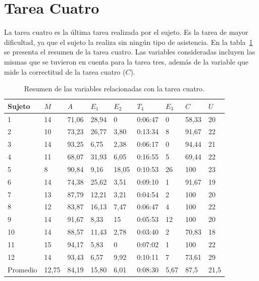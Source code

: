 \section{Tarea Cuatro}

La tarea cuatro es la \'ultima tarea realizada por el sujeto. Es la tarea
de mayor dificultad, ya que el sujeto la realiza sin ning\'un tipo de asistencia. 
En la tabla~\ref{sec:tabla-tarea4} se presenta el resumen de la tarea cuatro.
Las variables consideradas incluyen las mismas que se tuvieron en cuenta para la tarea
tres, adem\'as de la variable que mide la correctitud de la tarea cuatro ($C$).

\begin{table}[H]
\centering
\footnotesize
\begin{tabular}{|p{1.4cm}|p{1.4cm}|p{1.4cm}|p{1.4cm}|p{1.4cm}|p{1.4cm}|p{1.4cm}|p{1.4cm}|p{1.4cm}|}
\hline
Sujeto & $M$ & $A$ & $E_1$ & $E_2$  & $T_4$      & $E_3$ & $C$ & $U$ \\
 \hline 
1  & 14 &  71,06 & 28,94 &  0     &  0:06:47   &  0  &  58,33 &  20  \\ 
2  & 10 &  73,23 & 26,77 &  3,80  &  0:13:34   &  8  &  91,67 &  22 \\
3  & 14 &  93,25 & 6,75  &  2,38  &  0:06:17   &  0  &  94,44 &  21 \\
4  & 11 &  68,07 & 31,93 &  6,05  &  0:16:55   &  5  &  69,44 &  22 \\
5  & 8  &  90,84 & 9,16  &  18,05 &  0:10:53   &  26 &  100   &  23 \\
6  & 14 &  74,38 & 25,62 &  3,51  &  0:09:10   &  1  &  91,67 &  19  \\
7  & 13 &  87,79 & 12,21 &  3,21  &  0:04:54   &  2  &  100   &  20  \\
8  & 12 &  83,87 & 16,13 &  7,47  &  0:06:47   &  4  &  100   &  22  \\
9  & 14 &  91,67 & 8,33  &  15    &  0:05:53   &  12 &  100   &  20  \\
10 & 14 &  88,57 & 11,43 &  2,78  &  0:03:40   &  2  &  70,83 &  18  \\
11 & 15 &  94,17 & 5,83  &  0     &  0:07:02   &  1  &  100   &  22  \\
12 & 14 &  93,43 & 6,57  &  9,92  &  0:10:11   &  7  &  73,61 &  29  \\
\hline
  Promedio &  12,75 & 84,19   & 15,80 & 6,01 & 0:08:30 & 5,67 & 87,5  & 21,5   \\
\hline
\end{tabular}
\caption{Resumen de las variables relacionadas con la tarea cuatro.}
\label{sec:tabla-tarea4}
\end{table}

